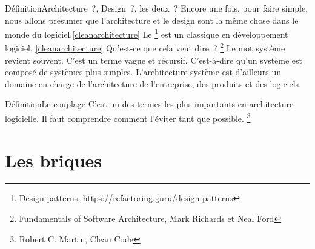 \documentclass{beamer}
\begin{document}
    \begin{frame}{Définition}{Architecture~?, Design~?, les deux~?}
        Encore une fois, pour faire simple, nous allons présumer que l'architecture et le design sont la même chose dans le monde du logiciel.\cref{cleanarchitecture}
        Le \footnote{Design patterns, \url{https://refactoring.guru/design-patterns}} est un classique en développement logiciel.
        \bigbreak
        \cref{cleanarchitecture} Qu'est-ce que cela veut dire~?
        \bigbreak
        \footnote{\label{fundsofsoftarch}Fundamentals of Software Architecture, Mark Richards et Neal Ford}
        \bigbreak
        Le mot système revient souvent.
        C'est un terme vague et récursif.
        C'est-à-dire qu'un système est composé de systèmes plus simples.
        L'architecture système est d'ailleurs un domaine en charge de l'architecture de l'entreprise, des produits et des logiciels.
    \end{frame}

    \begin{frame}{Définition}{Le couplage}
        C'est un des termes les plus importants en architecture logicielle.
        Il faut comprendre comment l'éviter tant que possible.
        \bigbreak
        \footnote{\label{cleancode}Robert C. Martin, Clean Code}
    \end{frame}


    \section{Les briques}\label{sec:les-briques}
\end{document}
